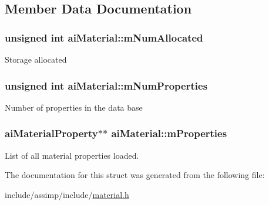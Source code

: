 \subsection{Member Data Documentation}
\hypertarget{structai_material_a84a0016a263362c52b27a9d8d76dc449}{
\subsubsection[{m\-Num\-Allocated}]{\setlength{\rightskip}{0pt plus 5cm}unsigned {\bf int} ai\-Material\-::m\-Num\-Allocated}}\label{structai_material_a84a0016a263362c52b27a9d8d76dc449}
Storage allocated \hypertarget{structai_material_a243b07afdc6507f8878c93a2cafe4963}{
\subsubsection[{m\-Num\-Properties}]{\setlength{\rightskip}{0pt plus 5cm}unsigned {\bf int} ai\-Material\-::m\-Num\-Properties}}\label{structai_material_a243b07afdc6507f8878c93a2cafe4963}
Number of properties in the data base \hypertarget{structai_material_af32b125d54bff5bc1fc54a1007487cab}{
\subsubsection[{m\-Properties}]{ ai\-Material\-Property$\ast$$\ast$ ai\-Material\-::m\-Properties}}\label{structai_material_af32b125d54bff5bc1fc54a1007487cab}
List of all material properties loaded. 

The documentation for this struct was generated from the following file\-:\begin{DoxyCompactItemize}
\item 
include/assimp/include/\hyperlink{material_8h}{material.\-h}\end{DoxyCompactItemize}
